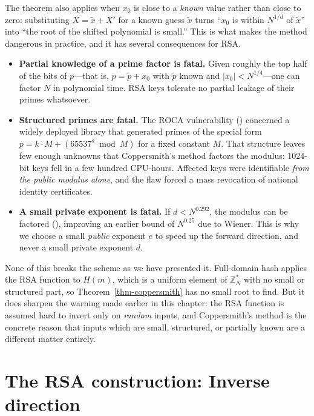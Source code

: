 \documentclass[
  letterpaper,
]{scrbook}
\newcommand{\Z}{\mathbb{Z}}
\theoremstyle{definition}
\theoremstyle{plain}
\theoremstyle{plain}
\theoremstyle{remark}
\begin{document}
The theorem also applies when \(x_0\) is close to a \emph{known} value
rather than close to zero: substituting \(X = \tilde{x} + X'\) for a
known guess \(\tilde x\) turns ``\(x_0\) is within \(N^{1/d}\) of
\(\tilde x\)'' into ``the root of the shifted polynomial is small.''
This is what makes the method dangerous in practice, and it has several
consequences for RSA.

\begin{itemize}
\item
  \textbf{Partial knowledge of a prime factor is fatal.} Given roughly
  the top half of the bits of \(p\)---that is, \(p = \tilde p +
  x_0\) with \(\tilde p\) known and \(|x_0| < N^{1/4}\)---one can factor
  \(N\) in polynomial time. RSA keys tolerate no partial leakage of
  their primes whatsoever.
\item
  \textbf{Structured primes are fatal.} The ROCA vulnerability
  () concerned a widely
  deployed library that generated primes of the special form
  \(p = k \cdot M +
  (65537^a \bmod M)\) for a fixed constant \(M\). That structure leaves
  few enough unknowns that Coppersmith's method factors the modulus:
  1024-bit keys fell in a few hundred CPU-hours. Affected keys were
  identifiable \emph{from the public modulus alone}, and the flaw forced
  a mass revocation of national identity certificates.
\item
  \textbf{A small private exponent is fatal.} If \(d <
  N^{0.292}\), the modulus can be factored (), improving an earlier bound of \(N^{0.25}\) due to
  Wiener. This is why we choose a small \emph{public} exponent \(e\) to
  speed up the forward direction, and never a small private exponent
  \(d\).
\end{itemize}

None of this breaks the scheme as we have presented it. Full-domain hash
applies the RSA function to \(H(m)\), which is a uniform element of
\(\Z^*_N\) with no small or structured part, so
Theorem~\ref{thm-coppersmith} has no small root to find. But it does
sharpen the warning made earlier in this chapter: the RSA function is
assumed hard to invert only on \emph{random} inputs, and Coppersmith's
method is the concrete reason that inputs which are small, structured,
or partially known are a different matter entirely.

\section{The RSA construction: Inverse
direction}\label{the-rsa-construction-inverse-direction}
\end{document}
